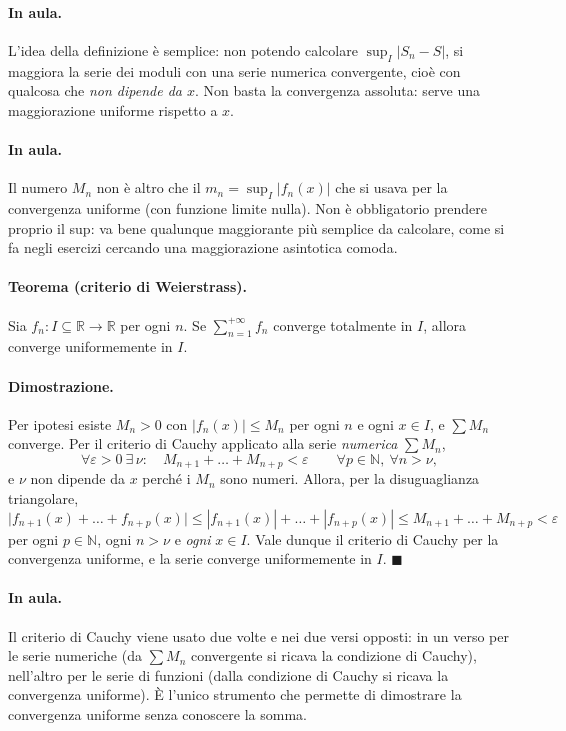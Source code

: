 \paragraph{In aula.} L'idea della definizione è semplice: non potendo calcolare
$\sup_I|S_n-S|$, si maggiora la serie dei moduli con una serie numerica convergente, cioè
con qualcosa che \emph{non dipende da $x$}. Non basta la convergenza assoluta: serve una
maggiorazione uniforme rispetto a $x$.

\paragraph{In aula.} Il numero $M_n$ non è altro che il $m_n=\sup_I|f_n(x)|$ che si usava
per la convergenza uniforme (con funzione limite nulla). Non è obbligatorio prendere
proprio il sup: va bene qualunque maggiorante più semplice da calcolare, come si fa negli
esercizi cercando una maggiorazione asintotica comoda.

\paragraph{Teorema (criterio di Weierstrass).} Sia
$f_n:I\subseteq\mathbb{R}\to\mathbb{R}$ per ogni $n$. Se $\sum_{n=1}^{+\infty}f_n$
converge totalmente in $I$, allora converge uniformemente in $I$.

\paragraph{Dimostrazione.} Per ipotesi esiste $M_n>0$ con $|f_n(x)|\le M_n$ per ogni $n$ e
ogni $x\in I$, e $\sum M_n$ converge. Per il criterio di Cauchy applicato alla serie
\emph{numerica} $\sum M_n$,
\[
\forall\varepsilon>0\ \exists\,\nu:\quad M_{n+1}+\dots+M_{n+p}<\varepsilon
\qquad\forall p\in\mathbb{N},\ \forall n>\nu,
\]
e $\nu$ non dipende da $x$ perché i $M_n$ sono numeri. Allora, per la disuguaglianza
triangolare,
\begin{equation}
\big|f_{n+1}(x)+\dots+f_{n+p}(x)\big|\le|f_{n+1}(x)|+\dots+|f_{n+p}(x)|
\le M_{n+1}+\dots+M_{n+p}<\varepsilon
\end{equation}
per ogni $p\in\mathbb{N}$, ogni $n>\nu$ e \emph{ogni} $x\in I$. Vale dunque il criterio di
Cauchy per la convergenza uniforme, e la serie converge uniformemente in $I$.
$\blacksquare$

\paragraph{In aula.} Il criterio di Cauchy viene usato due volte e nei due versi opposti:
in un verso per le serie numeriche (da $\sum M_n$ convergente si ricava la condizione di
Cauchy), nell'altro per le serie di funzioni (dalla condizione di Cauchy si ricava la
convergenza uniforme). È l'unico strumento che permette di dimostrare la convergenza
uniforme senza conoscere la somma.

